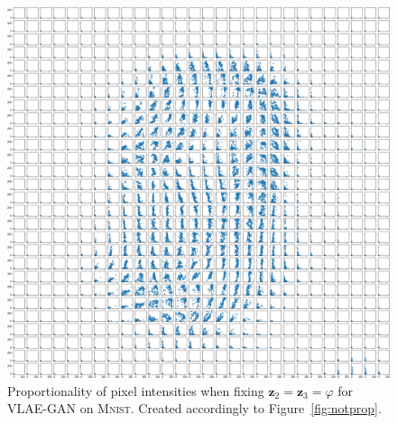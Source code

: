 \begin{figure}[H]
    \centering
    \includegraphics[width=\textwidth]{images/notprop/mnist/vlae_gan/ccs_1_2_vlae_gan.png}
    \caption[VLAE-GAN Pixel Proportionality - $\bm{z}_2$ vs. $\bm{z}_3$]{Proportionality of pixel intensities when fixing $\bm{z}_2 = \bm{z}_3=\varphi$ for \ac{VLAE}-\ac{GAN} on \textsc{Mnist}. Created accordingly to Figure~\ref{fig:notprop}.}
\end{figure}